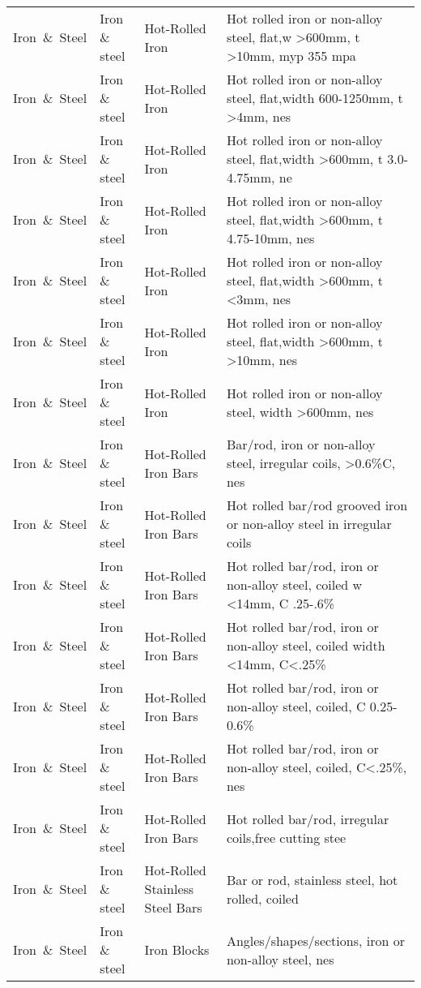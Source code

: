 \begin{appendices}
\begin{xltabular}{\textwidth}{|p{0.07\textwidth}|p{0.12\textwidth}|p{0.20\textwidth}|p{0.5\textwidth}|}
Iron\ \&\ Steel & Iron \& steel & Hot-Rolled Iron & Hot rolled iron or non-alloy steel, flat,w >600mm, t >10mm, myp 355 mpa \\
Iron\ \&\ Steel & Iron \& steel & Hot-Rolled Iron & Hot rolled iron or non-alloy steel, flat,width 600-1250mm, t >4mm, nes \\
Iron\ \&\ Steel & Iron \& steel & Hot-Rolled Iron & Hot rolled iron or non-alloy steel, flat,width >600mm, t 3.0-4.75mm, ne \\
Iron\ \&\ Steel & Iron \& steel & Hot-Rolled Iron & Hot rolled iron or non-alloy steel, flat,width >600mm, t 4.75-10mm, nes \\
Iron\ \&\ Steel & Iron \& steel & Hot-Rolled Iron & Hot rolled iron or non-alloy steel, flat,width >600mm, t <3mm, nes \\
Iron\ \&\ Steel & Iron \& steel & Hot-Rolled Iron & Hot rolled iron or non-alloy steel, flat,width >600mm, t >10mm, nes \\
Iron\ \&\ Steel & Iron \& steel & Hot-Rolled Iron & Hot rolled iron or non-alloy steel, width >600mm, nes \\
Iron\ \&\ Steel & Iron \& steel & Hot-Rolled Iron Bars & Bar/rod, iron or non-alloy steel, irregular coils, >0.6\%C, nes \\
Iron\ \&\ Steel & Iron \& steel & Hot-Rolled Iron Bars & Hot rolled bar/rod grooved iron or non-alloy steel in irregular coils \\
Iron\ \&\ Steel & Iron \& steel & Hot-Rolled Iron Bars & Hot rolled bar/rod, iron or non-alloy steel, coiled w <14mm, C .25-.6\% \\
Iron\ \&\ Steel & Iron \& steel & Hot-Rolled Iron Bars & Hot rolled bar/rod, iron or non-alloy steel, coiled width <14mm, C<.25\% \\
Iron\ \&\ Steel & Iron \& steel & Hot-Rolled Iron Bars & Hot rolled bar/rod, iron or non-alloy steel, coiled, C 0.25-0.6\% \\
Iron\ \&\ Steel & Iron \& steel & Hot-Rolled Iron Bars & Hot rolled bar/rod, iron or non-alloy steel, coiled, C<.25\%, nes \\
Iron\ \&\ Steel & Iron \& steel & Hot-Rolled Iron Bars & Hot rolled bar/rod, irregular coils,free cutting stee \\
Iron\ \&\ Steel & Iron \& steel & Hot-Rolled Stainless Steel Bars & Bar or rod, stainless steel, hot rolled, coiled \\
Iron\ \&\ Steel & Iron \& steel & Iron Blocks & Angles/shapes/sections, iron or non-alloy steel, nes \\

\end{xltabular}
\end{appendices}
